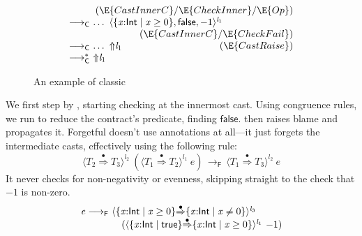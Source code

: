 \documentclass[9pt]{extarticle}
\newcommand{\ottnt}[1]{\mathit{#1}}
\newcommand{\ottsym}[1]{#1}
\begin{document}
{\begin{figure}
\[\begin{array}{r@{~}l}
 \multicolumn{2}{r}{(\E{CastInnerC}/\E{CheckInner}/\E{Op})} \\
  \longrightarrow _{  \mathsf{C}  }  &  \dots ~  \langle   \{ \mathit{x} \mathord{:}  \mathsf{Int}  \mathrel{\mid}  \mathit{x}  \mathrel{\ge}  \ottsym{0}  \}  ,   \mathsf{false}  ,   {-1}   \rangle^{ \ottnt{l_{{\mathrm{1}}}} }   \\
 \multicolumn{2}{r}{(\E{CastInnerC}/\E{CheckFail})} \\
  \longrightarrow _{  \mathsf{C}  }  &  \dots ~  \mathord{\Uparrow}  \ottnt{l_{{\mathrm{1}}}}   \qquad\qquad\qquad\qquad\qquad (\E{CastRaise}) \\ 
  \longrightarrow ^{*}_{  \mathsf{C}  }  &  \mathord{\Uparrow}  \ottnt{l_{{\mathrm{1}}}}  \\
\end{array} \]
\caption{An example of classic \lambdah}
\label{fig:classicexample}
\end{figure}
We first step by \ECheckNone, starting checking at the innermost
cast. Using congruence rules, we run  to reduce the contract's
predicate, finding $ \mathsf{false} $.  then raises blame and
 propagates it.
Forgetful \lambdah doesn't use annotations at all---it just forgets
the intermediate casts, effectively using the following rule:
\[  \langle  \ottnt{T_{{\mathrm{2}}}}  \mathord{ \overset{ \bullet }{\Rightarrow} }  \ottnt{T_{{\mathrm{3}}}}  \rangle^{ \ottnt{l_{{\mathrm{2}}}} } ~   (  \langle  \ottnt{T_{{\mathrm{1}}}}  \mathord{ \overset{ \bullet }{\Rightarrow} }  \ottnt{T_{{\mathrm{2}}}}  \rangle^{ \ottnt{l_{{\mathrm{1}}}} } ~  \ottnt{e}  )   \,  \longrightarrow _{  \mathsf{F}  }  \,  \langle  \ottnt{T_{{\mathrm{1}}}}  \mathord{ \overset{ \bullet }{\Rightarrow} }  \ottnt{T_{{\mathrm{3}}}}  \rangle^{ \ottnt{l_{{\mathrm{2}}}} } ~  \ottnt{e}  \]
It never checks for non-negativity or evenness, skipping straight to
the check that $ {-1} $ is non-zero.
\[ \begin{array}{r@{~}l}
  \ottnt{e}  \longrightarrow _{  \mathsf{F}  }  &  \langle   \{ \mathit{x} \mathord{:}  \mathsf{Int}  \mathrel{\mid}  \mathit{x}  \mathrel{\ge}  \ottsym{0}  \}   \mathord{ \overset{\bullet}{\Rightarrow} }   \{ \mathit{x} \mathord{:}  \mathsf{Int}  \mathrel{\mid}  \mathit{x}  \mathrel{\ne}  \ottsym{0}  \}   \rangle^{ \ottnt{l_{{\mathrm{3}}}} } ~  {} \\  &  \quad   (  \langle   \{ \mathit{x} \mathord{:}  \mathsf{Int}  \mathrel{\mid}  \mathsf{true}  \}   \mathord{ \overset{\bullet}{\Rightarrow} }   \{ \mathit{x} \mathord{:}  \mathsf{Int}  \mathrel{\mid}  \mathit{x}  \mathrel{\ge}  \ottsym{0}  \}   \rangle^{ \ottnt{l_{{\mathrm{1}}}} } ~   {-1}   )   \\

\end{array}\]}
\end{document}
